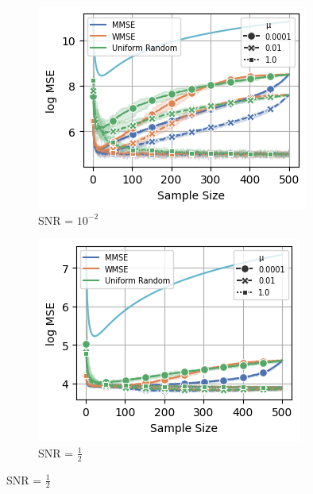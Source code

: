 \begin{figure}%
    \centering
    \begin{subfigure}{0.3\columnwidth}
    \includegraphics[width=\columnwidth]{figures/proj1/plots/GLR_MSE/SBM_500_bandwidth_50_SNRdbs_-20.0_samps_500_mus_0.0001_0.01_1_bl_noise.png}
    \caption{SNR = $10^{-2}$}
    \label{bandlimited_GLR_SBM_MSE_subfiga}
    \end{subfigure}\hfill
    \begin{subfigure}{0.3\columnwidth}
    \includegraphics[width=\columnwidth]{figures/proj1/plots/GLR_MSE/SBM_500_bandwidth_50_SNRdbs_-3.01_samps_500_mus_0.0001_0.01_1_bl_noise.png}
    \caption{SNR = $\frac{1}{2}$}%
    \label{bandlimited_GLR_SBM_MSE_subfigb}%

\end{subfigure}
\end{figure}
